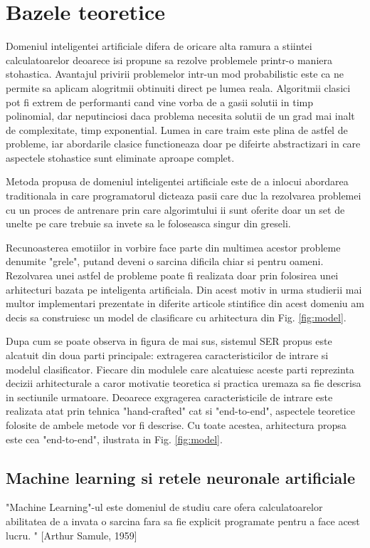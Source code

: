 \documentclass[a4paper,12pt]{book}
\begin{document}
			\chapter{Bazele teoretice}
				 Domeniul inteligentei artificiale difera de oricare alta ramura a stiintei calculatoarelor deoarece isi propune sa rezolve problemele printr-o maniera stohastica. Avantajul privirii problemelor intr-un mod probabilistic este ca ne permite sa aplicam alogritmii obtinuiti direct pe lumea reala. Algoritmii clasici pot fi extrem de performanti cand vine vorba de a gasii solutii in timp polinomial, dar neputinciosi daca problema necesita solutii de un grad mai inalt de complexitate, timp exponential. Lumea in care traim este plina de astfel de probleme, iar abordarile clasice functioneaza doar pe difeirte abstractizari in care aspectele stohastice sunt eliminate aproape complet. \par				 
				 Metoda propusa de domeniul inteligentei artificiale este de a inlocui abordarea traditionala in care programatorul dicteaza pasii care duc la rezolvarea problemei cu un proces de antrenare prin care algorimtului ii sunt oferite doar un set de unelte pe care trebuie sa invete sa le foloseasca singur din greseli. \par			 
				 Recunoasterea emotiilor in vorbire face parte din multimea acestor probleme denumite "grele", putand deveni o sarcina dificila chiar si pentru oameni. Rezolvarea unei astfel de probleme poate fi realizata doar prin folosirea unei arhitecturi bazata pe inteligenta artificiala. Din acest motiv in urma studierii mai multor implementari prezentate in diferite articole stintifice din acest domeniu am decis sa construiesc un model de clasificare cu arhitectura din Fig. \ref{fig:model}. \par
				Dupa cum se poate observa in figura de mai sus, sistemul SER propus este alcatuit din doua parti principale: extragerea caracteristicilor de intrare si modelul clasificator. Fiecare din modulele care alcatuiesc aceste parti reprezinta decizii arhitecturale a caror motivatie teoretica si practica uremaza sa fie descrisa in sectiunile urmatoare. Deoarece exgragerea caracteristicile de intrare este realizata atat prin tehnica "hand-crafted" cat si "end-to-end", aspectele teoretice folosite de ambele metode vor fi descrise. Cu toate acestea, arhitectura propsa este cea "end-to-end", ilustrata in Fig. \ref{fig:model}.
			\section{Machine learning si retele neuronale artificiale} \label{ml}
				"Machine Learning"-ul este domeniul de studiu care ofera calculatoarelor abilitatea de a invata o sarcina fara sa fie explicit programate pentru a face acest lucru. " [Arthur Samule, 1959]  \par
			
\end{document}
